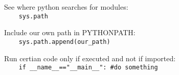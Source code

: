 See where python searches for modules:\\
{\ex \lstinline|    sys.path|}

Include our own path in PYTHONPATH:\\
{\ex \lstinline|    sys.path.append(our_path)|}

Run certian code only if executed and not if imported:\\
{\ex \lstinline|    if __name__=="__main__": #do something|}


